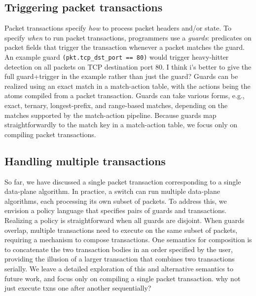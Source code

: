 \subsection{Triggering packet transactions}
\label{ss:guards}
Packet transactions specify \textit{how} to process packet headers and/or
state.  To specify {\em when} to run packet transactions, programmers use a {\em
guards}: predicates on packet fields that trigger the transaction whenever a
packet matches the guard. An example guard {\tt (pkt.tcp\_dst\_port == 80)} would
trigger heavy-hitter detection on all packets on TCP destination port 80.
\ac{I think i's better to give the full guard+trigger in the example rather than 
just the guard?} 
Guards can be realized using an exact match in a match-action table, with the
actions being the atoms compiled from a packet transaction. Guards
can take various forms, e.g., exact, ternary, longest-prefix, and range-based
matches, depending on the matches supported by the match-action
pipeline. Because guards map straightforwardly to the match key in a
match-action table, we focus only on compiling packet transactions.


\subsection{Handling multiple transactions}
\label{ss:multiple}
So far, we have discussed a single packet transaction corresponding to a single
data-plane algorithm. In practice, a switch can run multiple data-plane
algorithms, each processing its own subset of packets. To address this, we
envision a policy language that specifies pairs of guards and transactions.
Realizing a policy is straightforward when all guards are disjoint. When guards
overlap, multiple transactions need to execute on the same subset of packets,
requiring a mechanism to compose transactions. One semantics for composition is
to concatenate the two transaction bodies in an order specified by the user,
providing the illusion of a larger transaction that combines two transactions serially.
We leave a detailed exploration of this and alternative semantics to future
work, and focus only on compiling a single packet transaction.
\ac{why not just execute txns one after another sequentially?}


